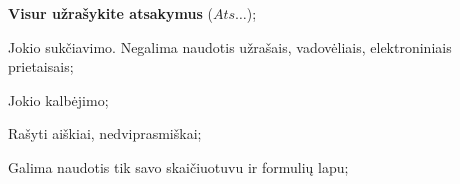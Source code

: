 \documentclass[a4paper]{article}
\begin{document}
\begin{small}
      \begin{enumerate*}[label={(\arabic*)}]
            \item \textbf{Visur užrašykite atsakymus} ($Ats\ldots$);
            \item Jokio sukčiavimo. Negalima naudotis užrašais, vadovėliais,
            elektroniniais prietaisais;
            \item Jokio kalbėjimo;
            \item Rašyti aiškiai, nedviprasmiškai;
            \item Galima naudotis tik savo skaičiuotuvu ir formulių lapu;
      \end{enumerate*}
\end{small}
\end{document}

